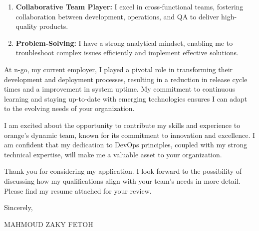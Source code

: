 \documentclass[a4paper,10pt]{letter}
\begin{document}
\begin{letter}
\begin{enumerate}[label=\textbf{\arabic*.}]
    \item \textbf{Collaborative Team Player:} I excel in cross-functional teams, fostering collaboration between development, operations, and QA to deliver high-quality products.

    \item \textbf{Problem-Solving:} I have a strong analytical mindset, enabling me to troubleshoot complex issues efficiently and implement effective solutions.
\end{enumerate}

At n-go, my current employer, I played a pivotal role in transforming their development and deployment processes, resulting in a reduction in release cycle times and a improvement in system uptime. My commitment to continuous learning and staying up-to-date with emerging technologies ensures I can adapt to the evolving needs of your organization.

I am excited about the opportunity to contribute my skills and experience to orange's dynamic team, known for its commitment to innovation and excellence. I am confident that my dedication to DevOps principles, coupled with my strong technical expertise, will make me a valuable asset to your organization.

Thank you for considering my application. I look forward to the possibility of discussing how my qualifications align with your team's needs in more detail. Please find my resume attached for your review.

\closing{Sincerely,}

MAHMOUD ZAKY FETOH
\end{letter}
\end{document}
